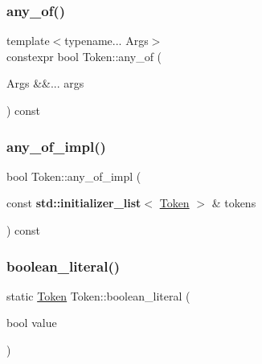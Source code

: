 \mbox{\label{class_token_a154f07c45f704f530fcf5b0ef2eaeeef}} 
\subsubsection{\texorpdfstring{any\+\_\+of()}{any\_of()}\hspace{0.1cm}{\footnotesize\ttfamily [3/3]}}
{\footnotesize\ttfamily template$<$typename... Args$>$ \\
constexpr bool Token\+::any\+\_\+of (\begin{DoxyParamCaption}\item[{Args \&\&...}]{args }\end{DoxyParamCaption}) const\hspace{0.3cm}{\ttfamily [inline]}}

\mbox{\label{class_token_abefa8f417ddd59dcb37a2cfd357a51bf}} 
\subsubsection{\texorpdfstring{any\+\_\+of\+\_\+impl()}{any\_of\_impl()}}
{\footnotesize\ttfamily bool Token\+::any\+\_\+of\+\_\+impl (\begin{DoxyParamCaption}\item[{const \textbf{ std\+::initializer\+\_\+list}$<$ \hyperlink{class_token}{Token} $>$ \&}]{tokens }\end{DoxyParamCaption}) const\hspace{0.3cm}{\ttfamily [inline]}}

\mbox{\label{class_token_abf22f2214f3329ccb66ce5d9d9d16fd8}} 
\subsubsection{\texorpdfstring{boolean\+\_\+literal()}{boolean\_literal()}}
{\footnotesize\ttfamily static \hyperlink{class_token}{Token} Token\+::boolean\+\_\+literal (\begin{DoxyParamCaption}\item[{bool}]{value }\end{DoxyParamCaption})\hspace{0.3cm}{\ttfamily [static]}}

